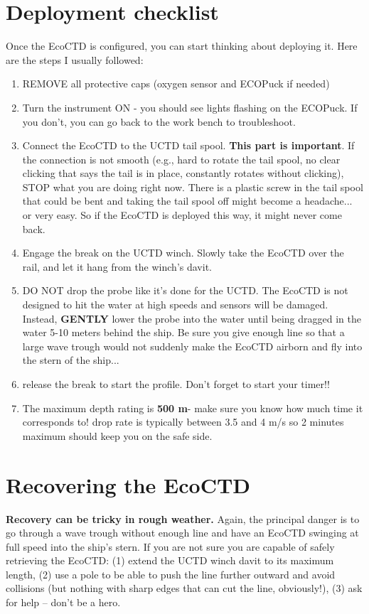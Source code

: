\documentclass[13pt]{article}
\begin{document}
\section{Deployment checklist}
Once the EcoCTD is configured, you can start thinking about deploying it. Here are the steps I usually followed:
\begin{enumerate}
    \item REMOVE all protective caps (oxygen sensor and ECOPuck if needed)
    \item Turn the instrument ON - you should see lights flashing on the ECOPuck. If you don't, you can go back to the work bench to troubleshoot.
    \item Connect the EcoCTD to the UCTD tail spool. \textbf{This part is important}. If the connection is not smooth (e.g., hard to rotate the tail spool, no clear clicking that says the tail is in place, constantly rotates without clicking), STOP what you are doing right now. There is a plastic screw in the tail spool that could be bent and taking the tail spool off might become a headache... or very easy. So if the EcoCTD is deployed this way, it might never come back.
    \item Engage the break on the UCTD winch. Slowly take the EcoCTD over the rail, and let it hang from the winch's davit.
    \item DO NOT drop the probe like it's done for the UCTD. The EcoCTD is not designed to hit the water at high speeds and sensors will be damaged. Instead, \textbf{GENTLY} lower the probe into the water until being dragged in the water 5-10 meters behind the ship. Be sure you give enough line so that a large wave trough would not suddenly make the EcoCTD airborn and fly into the stern of the ship... 
    \item release the break to start the profile. Don't forget to start your timer!! 
    \item {\color{red} The maximum depth rating is \textbf{500 m}- make sure you know how much time it corresponds to! drop rate is typically between 3.5 and 4 m/s so 2 minutes maximum should keep you on the safe side.}
\end{enumerate}

\section{Recovering the EcoCTD}
\textbf{Recovery can be tricky in rough weather.} Again, the principal danger is to go through a wave trough without enough line and have an EcoCTD swinging at full speed into the ship's stern. If you are not sure you are capable of safely retrieving the EcoCTD: (1) extend the UCTD winch davit to its maximum length, (2) use a pole to be able to push the line further outward and avoid collisions (but nothing with sharp edges that can cut the line, obviously!), (3) ask for help -- don't be a hero.
\end{document}
